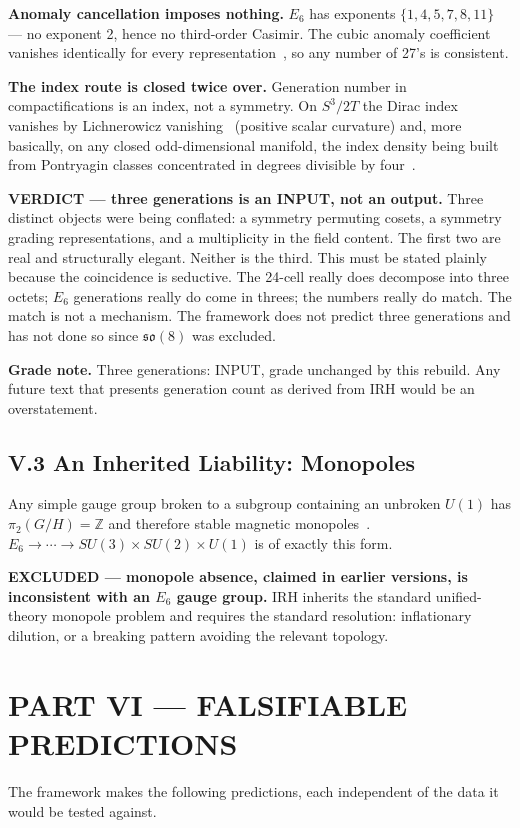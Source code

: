 \documentclass[11pt,a4paper]{article}
\newcommand{\gradebox}[1]{\par\smallskip\noindent\textbf{Grade note.} #1\par\smallskip}
\begin{document}
\textbf{Anomaly cancellation imposes nothing.} $E_6$ has exponents $\{1,4,5,7,8,11\}$ --- no exponent 2, hence no third-order Casimir. The cubic anomaly coefficient vanishes identically for every representation~\cite{slansky1981}, so any number of 27's is consistent.

\textbf{The index route is closed twice over.} Generation number in compactifications is an index, not a symmetry. On $S^3/2T$ the Dirac index vanishes by Lichnerowicz vanishing~\cite{lichnerowicz1963} (positive scalar curvature) and, more basically, on any closed odd-dimensional manifold, the index density being built from Pontryagin classes concentrated in degrees divisible by four~\cite{lawson1989}.

\textbf{VERDICT --- three generations is an INPUT, not an output.} Three distinct objects were being conflated: a symmetry permuting cosets, a symmetry grading representations, and a multiplicity in the field content. The first two are real and structurally elegant. Neither is the third. This must be stated plainly because the coincidence is seductive. The 24-cell really does decompose into three octets; $E_6$ generations really do come in threes; the numbers really do match. The match is not a mechanism. The framework does not predict three generations and has not done so since $\mathfrak{so}(8)$ was excluded.
\gradebox{Three generations: INPUT, grade unchanged by this rebuild. Any future text that presents generation count as derived from IRH would be an overstatement.}

\subsection{V.3 An Inherited Liability: Monopoles}
Any simple gauge group broken to a subgroup containing an unbroken $U(1)$ has $\pi_2(G/H) = \mathbb{Z}$ and therefore stable magnetic monopoles~\cite{preskill1984}. $E_6 \to \cdots \to SU(3)\times SU(2)\times U(1)$ is of exactly this form.

\textbf{EXCLUDED --- monopole absence, claimed in earlier versions, is inconsistent with an $E_6$ gauge group.} IRH inherits the standard unified-theory monopole problem and requires the standard resolution: inflationary dilution, or a breaking pattern avoiding the relevant topology.

\section{PART VI --- FALSIFIABLE PREDICTIONS}
The framework makes the following predictions, each independent of the data it would be tested against.
\end{document}
